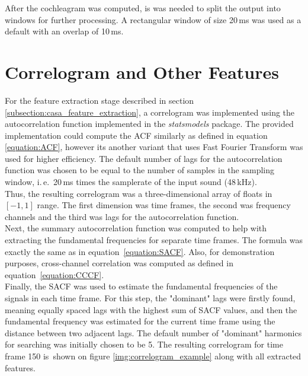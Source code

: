 After the cochleagram was computed, is was needed to split the output into windows for further processing. A rectangular window of size 20\,ms was used as a default with an overlap of 10\,ms.

\section{Correlogram and Other Features}

For the feature extraction stage described in section \ref{subsection:casa_feature_extraction}, a correlogram was implemented using the autocorrelation function implemented in the \textit{statsmodels} package. The provided implementation could compute the ACF similarly as defined in equation \ref{equation:ACF}, however its another variant that uses Fast Fourier Transform was used for higher efficiency. The default number of lags for the autocorrelation function was chosen to be equal to the number of samples in the sampling window, i.\,e.~20\,ms times the samplerate of the input sound (48\,kHz).\\

Thus, the resulting correlogram was a three-dimensional array of floats in $[-1, 1]$ range. The first dimension was time frames, the second was frequency channels and the third was lags for the autocorrelation function.\\

Next, the summary autocorrelation function was computed to help with extracting the fundamental frequencies for separate time frames. The formula was exactly the same as in equation~\ref{equation:SACF}. Also, for demonstration purposes, cross-channel correlation was computed as defined in equation~\ref{equation:CCCF}.\\

Finally, the SACF was used to estimate the fundamental frequencies of the signals in each time frame. For this step, the "dominant" lags were firstly found, meaning equally spaced lags with the highest sum of SACF values, and then the fundamental frequency was estimated for the current time frame using the distance between two adjacent lags. The default number of "dominant" harmonics for searching was initially chosen to be 5. The resulting correlogram for time frame 150 is~shown on figure \ref{img:correlogram_example} along with all extracted features.

